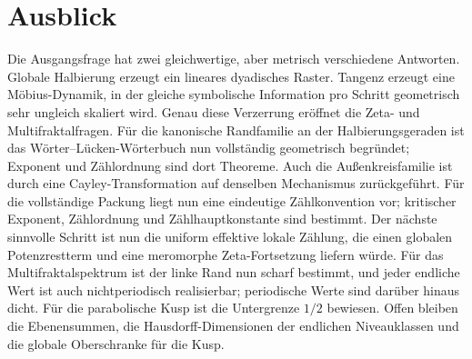 \documentclass[11pt,a4paper]{article}
\begin{document}
\section{Ausblick}

Die Ausgangsfrage hat zwei gleichwertige, aber metrisch verschiedene
Antworten. Globale Halbierung erzeugt ein lineares dyadisches Raster.
Tangenz erzeugt eine Möbius-Dynamik, in der gleiche symbolische Information
pro Schritt geometrisch sehr ungleich skaliert wird. Genau diese Verzerrung
eröffnet die Zeta- und Multifraktalfragen. Für die kanonische Randfamilie
an der Halbierungsgeraden ist das Wörter--Lücken-Wörterbuch nun vollständig
geometrisch begründet; Exponent und Zählordnung sind dort Theoreme. Auch die
Außenkreisfamilie ist durch eine Cayley-Transformation auf denselben
Mechanismus zurückgeführt. Für die vollständige Packung liegt nun eine
eindeutige Zählkonvention vor; kritischer Exponent, Zählordnung und
Zählhauptkonstante sind bestimmt. Der nächste sinnvolle Schritt ist nun die
uniform effektive lokale Zählung, die einen globalen Potenzrestterm und eine
meromorphe Zeta-Fortsetzung liefern würde. Für das Multifraktalspektrum ist
der linke Rand nun scharf bestimmt, und jeder endliche Wert ist auch
nichtperiodisch realisierbar; periodische Werte sind darüber hinaus dicht.
Für die parabolische Kusp ist die Untergrenze $1/2$ bewiesen. Offen
bleiben die Ebenensummen, die Hausdorff-Dimensionen der endlichen
Niveauklassen und die globale Oberschranke für die Kusp.
\end{document}
